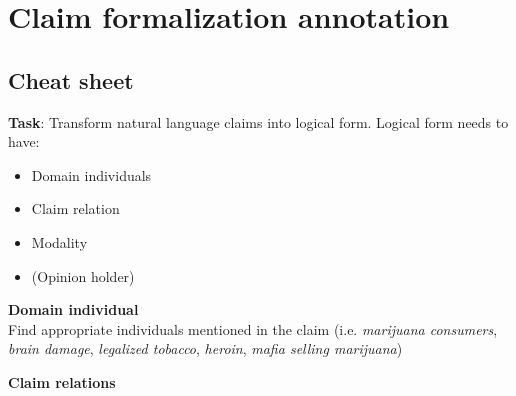 \section{Claim formalization annotation}
\label{sec:formalization_annotation}

\subsection*{Cheat sheet}

\textbf{Task}: Transform natural language claims into logical form. Logical form needs to have:
\begin{itemize}
\item Domain individuals 
\item Claim relation
\item Modality
\item (Opinion holder)
\end{itemize}

\vspace{0.3cm}

\noindent \textbf{Domain individual} \\
Find appropriate individuals mentioned in the claim (i.e. \textit{marijuana consumers},
\textit{brain damage}, \textit{legalized tobacco}, \textit{heroin}, \textit{mafia selling marijuana}) \\

\pagebreak

\noindent \textbf{Claim relations} \\

